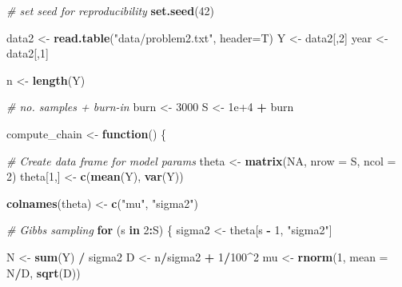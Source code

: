 \documentclass[
]{homework}
\newenvironment{Shaded}{\begin{snugshade}}{\end{snugshade}}
\newcommand{\AttributeTok}[1]{\textcolor[rgb]{0.13,0.29,0.53}{#1}}
\newcommand{\CommentTok}[1]{\textcolor[rgb]{0.56,0.35,0.01}{\textit{#1}}}
\newcommand{\ConstantTok}[1]{\textcolor[rgb]{0.56,0.35,0.01}{#1}}
\newcommand{\ControlFlowTok}[1]{\textcolor[rgb]{0.13,0.29,0.53}{\textbf{#1}}}
\newcommand{\DecValTok}[1]{\textcolor[rgb]{0.00,0.00,0.81}{#1}}
\newcommand{\FloatTok}[1]{\textcolor[rgb]{0.00,0.00,0.81}{#1}}
\newcommand{\FunctionTok}[1]{\textcolor[rgb]{0.13,0.29,0.53}{\textbf{#1}}}
\newcommand{\NormalTok}[1]{#1}
\newcommand{\OtherTok}[1]{\textcolor[rgb]{0.56,0.35,0.01}{#1}}
\newcommand{\SpecialCharTok}[1]{\textcolor[rgb]{0.81,0.36,0.00}{\textbf{#1}}}
\newcommand{\StringTok}[1]{\textcolor[rgb]{0.31,0.60,0.02}{#1}}
\begin{document}
\begin{Shaded}
\begin{Highlighting}[]
\CommentTok{\# set seed for reproducibility}
\FunctionTok{set.seed}\NormalTok{(}\DecValTok{42}\NormalTok{)}

\NormalTok{data2 }\OtherTok{\textless{}{-}} \FunctionTok{read.table}\NormalTok{(}\StringTok{"data/problem2.txt"}\NormalTok{, }\AttributeTok{header=}\NormalTok{T)}
\NormalTok{Y     }\OtherTok{\textless{}{-}}\NormalTok{ data2[,}\DecValTok{2}\NormalTok{] }
\NormalTok{year  }\OtherTok{\textless{}{-}}\NormalTok{ data2[,}\DecValTok{1}\NormalTok{]}

\NormalTok{n }\OtherTok{\textless{}{-}} \FunctionTok{length}\NormalTok{(Y)}

\CommentTok{\# no. samples + burn{-}in}
\NormalTok{burn }\OtherTok{\textless{}{-}} \DecValTok{3000}
\NormalTok{S    }\OtherTok{\textless{}{-}} \FloatTok{1e+4} \SpecialCharTok{+}\NormalTok{ burn}

\NormalTok{compute\_chain }\OtherTok{\textless{}{-}} \ControlFlowTok{function}\NormalTok{() \{}
  
  \CommentTok{\# Create data frame for model params}
\NormalTok{  theta     }\OtherTok{\textless{}{-}} \FunctionTok{matrix}\NormalTok{(}\ConstantTok{NA}\NormalTok{, }\AttributeTok{nrow =}\NormalTok{ S, }\AttributeTok{ncol =} \DecValTok{2}\NormalTok{)}
\NormalTok{  theta[}\DecValTok{1}\NormalTok{,] }\OtherTok{\textless{}{-}} \FunctionTok{c}\NormalTok{(}\FunctionTok{mean}\NormalTok{(Y), }\FunctionTok{var}\NormalTok{(Y))}
  
  \FunctionTok{colnames}\NormalTok{(theta) }\OtherTok{\textless{}{-}} \FunctionTok{c}\NormalTok{(}\StringTok{"mu"}\NormalTok{, }\StringTok{"sigma2"}\NormalTok{)}
  
  \CommentTok{\# Gibbs sampling}
  \ControlFlowTok{for}\NormalTok{ (s }\ControlFlowTok{in} \DecValTok{2}\SpecialCharTok{:}\NormalTok{S) \{}
\NormalTok{    sigma2 }\OtherTok{\textless{}{-}}\NormalTok{ theta[s }\SpecialCharTok{{-}} \DecValTok{1}\NormalTok{, }\StringTok{"sigma2"}\NormalTok{]}
    
\NormalTok{    N }\OtherTok{\textless{}{-}} \FunctionTok{sum}\NormalTok{(Y) }\SpecialCharTok{/}\NormalTok{ sigma2}
\NormalTok{    D }\OtherTok{\textless{}{-}}\NormalTok{ n}\SpecialCharTok{/}\NormalTok{sigma2 }\SpecialCharTok{+} \DecValTok{1}\SpecialCharTok{/}\DecValTok{100}\SpecialCharTok{\^{}}\DecValTok{2}
\NormalTok{    mu  }\OtherTok{\textless{}{-}} \FunctionTok{rnorm}\NormalTok{(}\DecValTok{1}\NormalTok{, }\AttributeTok{mean =}\NormalTok{ N}\SpecialCharTok{/}\NormalTok{D, }\FunctionTok{sqrt}\NormalTok{(D))}


\end{Highlighting}
\end{Shaded}
\end{document}
